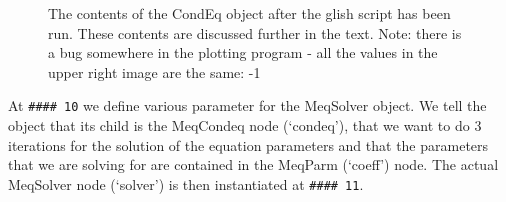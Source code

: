 \documentclass[10pt]{article}
\begin{document}
\begin{figure}
{\par\centering
{}
\par}
\caption {The contents of the CondEq object after the glish script
has been run. These contents are discussed further 
in the text. Note: there is a bug somewhere in the plotting program -
all the values in the upper right image are the same: -1}
\label{fig:condeq}
\end{figure}

At {\tt \#\#\#\# 10} we define various parameter for the MeqSolver object.
We tell the object that its child is the MeqCondeq node (`condeq'), that
we want to do 3 iterations for the solution of the equation parameters
and that the parameters that we are solving for are contained
in the MeqParm (`coeff') node. The actual MeqSolver node (`solver') is
then instantiated at {\tt \#\#\#\# 11}. 
\end{document}
